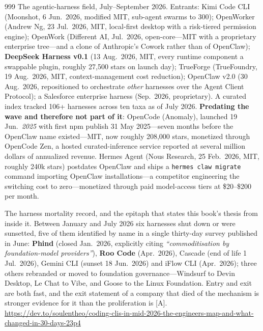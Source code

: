 \begin{thebibliography}{999}
 The agentic-harness field, July--September 2026. Entrants: Kimi Code CLI (Moonshot, 6 Jun.\ 2026, modified MIT, sub-agent swarms to 300); OpenWorker (Andrew Ng, 23 Jul.\ 2026, MIT, local-first desktop with a risk-tiered permission engine); OpenWork (Different AI, Jul.\ 2026, open-core---MIT with a proprietary enterprise tree---and a clone of Anthropic's Cowork rather than of OpenClaw); \textbf{DeepSeek Harness v0.1} (13 Aug.\ 2026, MIT, every runtime component a swappable plugin, roughly 27,500 stars on launch day); TrueForge (TrueFoundry, 19 Aug.\ 2026, MIT, context-management cost reduction); OpenClaw v2.0 (30 Aug.\ 2026, repositioned to orchestrate \emph{other} harnesses over the Agent Client Protocol); a Salesforce enterprise harness (Sep.\ 2026, proprietary). A curated index tracked 106+ harnesses across ten taxa as of July 2026. \textbf{Predating the wave and therefore not part of it}: OpenCode (Anomaly), launched 19 Jun.\ \emph{2025} with first npm publish 31 May 2025---seven months before the OpenClaw name existed---MIT, now roughly 208,000 stars, monetized through OpenCode Zen, a hosted curated-inference service reported at several million dollars of annualized revenue. Hermes Agent (Nous Research, 25 Feb.\ 2026, MIT, roughly 240k stars) postdates OpenClaw and ships a \texttt{hermes claw migrate} command importing OpenClaw installations---a competitor engineering the switching cost to zero---monetized through paid model-access tiers at \$20--\$200 per month.

 The harness mortality record, and the epitaph that states this book's thesis from inside it. Between January and July 2026 six harnesses shut down or were sunsetted, five of them identified by name in a single thirty-day survey published in June: \textbf{Phind} (closed Jan.\ 2026, explicitly citing \emph{``commoditisation by foundation-model providers''}), \textbf{Roo Code} (Apr.\ 2026), Cascade (end of life 1 Jul.\ 2026), Gemini CLI (sunset 18 Jun.\ 2026) and iFlow CLI (Apr.\ 2026); three others rebranded or moved to foundation governance---Windsurf to Devin Desktop, Le Chat to Vibe, and Goose to the Linux Foundation. Entry and exit are both fast, and the exit statement of a company that died of the mechanism is stronger evidence for it than the proliferation is [A]. \url{https://dev.to/soulentheo/coding-clis-in-mid-2026-the-engineers-map-and-what-changed-in-30-days-23p4}


\end{thebibliography}
